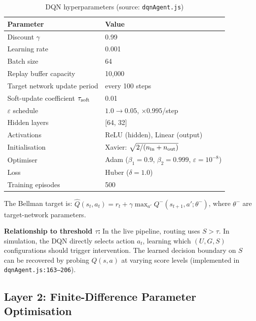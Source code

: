 \documentclass[conference]{IEEEtran}
\begin{document}
\begin{table}[!t]
  \caption{DQN hyperparameters (source: \texttt{dqnAgent.js})}
  \label{tab:dqn}
  \renewcommand{\arraystretch}{1.1}
  \begin{tabular}{@{}ll@{}}
    \toprule
    Parameter & Value \\
    \midrule
    Discount $\gamma$               & 0.99 \\
    Learning rate                   & 0.001 \\
    Batch size                      & 64 \\
    Replay buffer capacity          & 10{,}000 \\
    Target network update period    & every 100 steps \\
    Soft-update coefficient $\tau_{\rm soft}$ & 0.01 \\
    $\varepsilon$ schedule          & $1.0 \to 0.05$, ${\times}0.995$/step \\
    Hidden layers                   & [64, 32] \\
    Activations                     & ReLU (hidden), Linear (output) \\
    Initialisation                  & Xavier: $\sqrt{2/(n_{\rm in}+n_{\rm out})}$ \\
    Optimiser                       & Adam ($\beta_1{=}0.9$, $\beta_2{=}0.999$, $\varepsilon{=}10^{-8}$) \\
    Loss                            & Huber ($\delta{=}1.0$) \\
    Training episodes               & 500 \\
    \bottomrule
  \end{tabular}
\end{table}

The Bellman target is:
$\hat{Q}(s_t,a_t) = r_t + \gamma \max_{a'} Q^{-}(s_{t+1}, a'; \theta^-)$,
where $\theta^-$ are target-network parameters.

\textbf{Relationship to threshold $\tau$:}
In the live pipeline, routing uses $S > \tau$.
In simulation, the DQN directly selects action $a_t$, learning which
$(U,G,S)$ configurations should trigger intervention.
The learned decision boundary on $S$ can be recovered by probing
$Q(s,a)$ at varying score levels (implemented in
\texttt{dqnAgent.js:163--206}).

\subsection{Layer 2: Finite-Difference Parameter Optimisation}
\label{subsec:fd}
\end{document}
